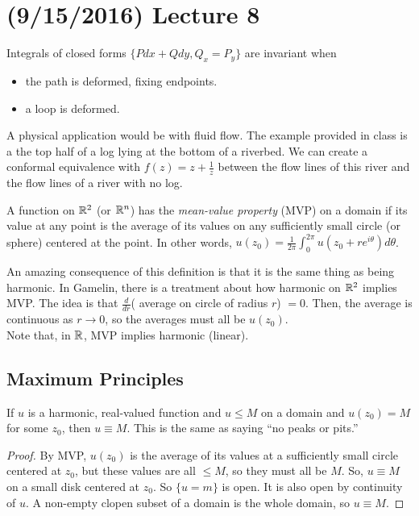 \documentclass[11pt,leqno,oneside]{amsart}
\begin{document}
  \section{(9/15/2016) Lecture 8}
  Integrals of closed forms $\{Pdx+Qdy, Q_x = P_y\}$ are invariant
  when
  \begin{itemize}
  \item the path is deformed, fixing endpoints.
  \item a loop is deformed.
  \end{itemize}

  A physical application would be with fluid flow. The example
  provided in class is a the top half of a log lying at the bottom of
  a riverbed. We can create a conformal equivalence with $f(z) =
  z+\frac{1}{z}$ between the flow lines of this river and the flow
  lines of a river with no log.

  \begin{defn}
    A function on ${\mathbb R}^2$ (or ${\mathbb R}^n$) has the \emph{mean-value
      property} (MVP) on a domain if its value at any point is the
    average of its values on any sufficiently small circle (or sphere)
    centered at the point. In other words, $u(z_0) = \frac{1}{2\pi}
    \int_0^{2\pi} u(z_0+re^{i\theta}) d\theta$.
  \end{defn}
  An amazing consequence of this definition is that it is the same
  thing as being harmonic. In Gamelin, there is a treatment about how
  harmonic on ${\mathbb R}^2$ implies MVP. The idea is that $\frac{d}{dr}$(
  average on circle of radius $r$) $=0$. Then, the average is
  continuous as $r \to 0$, so the averages must all be $u(z_0)$. \\

  Note that, in ${\mathbb R}$, MVP implies harmonic (linear).

  \subsection*{Maximum Principles}

  \begin{thm}
    If $u$ is a harmonic, real-valued function and $u \leq M$ on a
    domain and $u(z_0) = M$ for some $z_0$, then $u \equiv M$. This is
    the same as saying ``no peaks or pits.''
  \end{thm}
  \begin{proof}
    By MVP, $u(z_0)$ is the average of its values at a sufficiently
    small circle centered at $z_0$, but these values are all $\leq M$,
    so they must all be $M$. So, $u \equiv M$ on a small disk centered
    at $z_0$. So $\{u = m\}$ is open. It is also open by continuity of
    $u$. A non-empty clopen subset of a domain is the whole domain, so
    $u \equiv M$.
  \end{proof}
\end{document}
